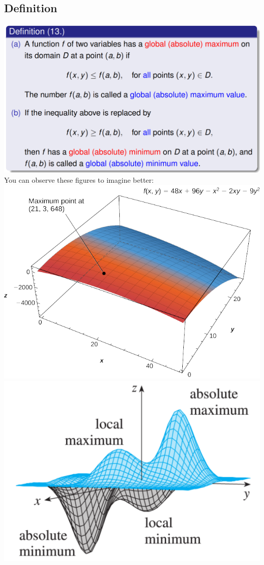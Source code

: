 \documentclass{article}
\begin{document}
\subsection{Definition}
\includegraphics[width=1\linewidth]{4.png}\\
You can observe these figures to imagine better:
\\
\includegraphics[width=0.5\linewidth]{4.1.png}    \includegraphics[width=0.5\linewidth]{4.12.png}
\end{document}
